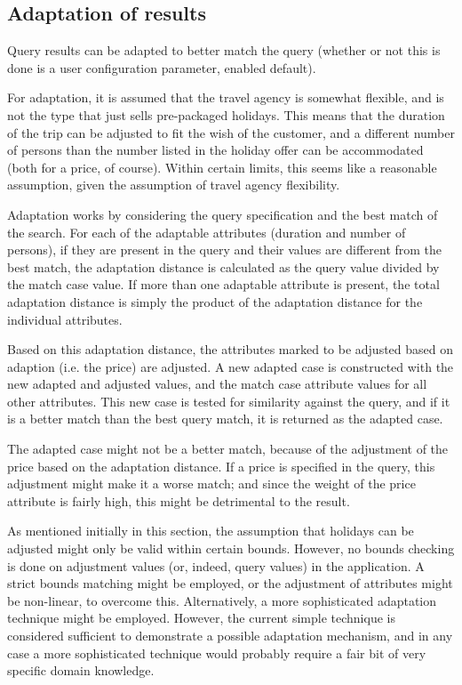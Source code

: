 \documentclass[a4paper,11pt]{scrartcl}
\begin{document}
\subsection{Adaptation of results}
Query results can be adapted to better match the query (whether or not
this is done is a user configuration parameter, enabled default).

For adaptation, it is assumed that the travel agency is somewhat
flexible, and is not the type that just sells pre-packaged holidays.
This means that the duration of the trip can be adjusted to fit the
wish of the customer, and a different number of persons than the
number listed in the holiday offer can be accommodated (both for a
price, of course). Within certain limits, this seems like a reasonable
assumption, given the assumption of travel agency flexibility.

Adaptation works by considering the query specification and the best
match of the search. For each of the adaptable attributes (duration
and number of persons), if they are present in the query and their
values are different from the best match, the adaptation distance is
calculated as the query value divided by the match case value. If more
than one adaptable attribute is present, the total adaptation distance
is simply the product of the adaptation distance for the individual
attributes.

Based on this adaptation distance, the attributes marked to be
adjusted based on adaption (i.e. the price) are adjusted. A new
adapted case is constructed with the new adapted and adjusted values,
and the match case attribute values for all other attributes. This new
case is tested for similarity against the query, and if it is a better
match than the best query match, it is returned as the adapted case.

The adapted case might not be a better match, because of the
adjustment of the price based on the adaptation distance. If a price
is specified in the query, this adjustment might make it a worse
match; and since the weight of the price attribute is fairly high,
this might be detrimental to the result.

As mentioned initially in this section, the assumption that holidays
can be adjusted might only be valid within certain bounds. However, no
bounds checking is done on adjustment values (or, indeed, query
values) in the application. A strict bounds matching might be
employed, or the adjustment of attributes might be non-linear, to
overcome this. Alternatively, a more sophisticated adaptation
technique might be employed. However, the current simple technique is
considered sufficient to demonstrate a possible adaptation mechanism,
and in any case a more sophisticated technique would probably require
a fair bit of very specific domain knowledge.
\end{document}
